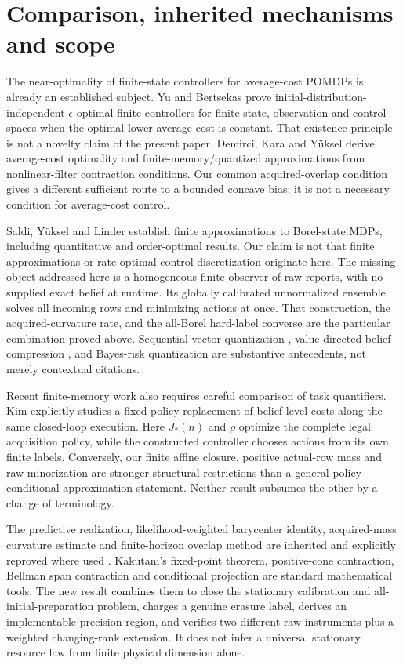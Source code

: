 \section{Comparison, inherited mechanisms and scope}\label{sec:comparison}
The near-optimality of finite-state controllers for average-cost POMDPs is already an established subject. Yu and Bertsekas \cite{YuBertsekas2008} prove initial-distribution-independent $\epsilon$-optimal finite controllers for finite state, observation and control spaces when the optimal lower average cost is constant. That existence principle is not a novelty claim of the present paper. Demirci, Kara and Y\"uksel \cite{DKY2024} derive average-cost optimality and finite-memory/quantized approximations from nonlinear-filter contraction conditions. Our common acquired-overlap condition gives a different sufficient route to a bounded concave bias; it is not a necessary condition for average-cost control.

Saldi, Y\"uksel and Linder \cite{SYL2016} establish finite approximations to Borel-state MDPs, including quantitative and order-optimal results. Our claim is not that finite approximations or rate-optimal control discretization originate here. The missing object addressed here is a homogeneous finite observer of raw reports, with no supplied exact belief at runtime. Its globally calibrated unnormalized ensemble solves all incoming rows and minimizing actions at once. That construction, the acquired-curvature rate, and the all-Borel hard-label converse are the particular combination proved above. Sequential vector quantization \cite{BMT2001}, value-directed belief compression \cite{PB2002}, and Bayes-risk quantization \cite{Varshney2011} are substantive antecedents, not merely contextual citations.

Recent finite-memory work also requires careful comparison of task quantifiers. Kim \cite{Kim2026} explicitly studies a fixed-policy replacement of belief-level costs along the same closed-loop execution. Here $J_*(n)$ and $\rho$ optimize the complete legal acquisition policy, while the constructed controller chooses actions from its own finite labels. Conversely, our finite affine closure, positive actual-row mass and raw minorization are stronger structural restrictions than a general policy-conditional approximation statement. Neither result subsumes the other by a change of terminology.

The predictive realization, likelihood-weighted barycenter identity, acquired-mass curvature estimate and finite-horizon overlap method are inherited and explicitly reproved where used \cite{GTFBayes,GTFControlled}. Kakutani's fixed-point theorem, positive-cone contraction, Bellman span contraction and conditional projection are standard mathematical tools. The new result combines them to close the stationary calibration and all-initial-preparation problem, charges a genuine erasure label, derives an implementable precision region, and verifies two different raw instruments plus a weighted changing-rank extension. It does not infer a universal stationary resource law from finite physical dimension alone.

